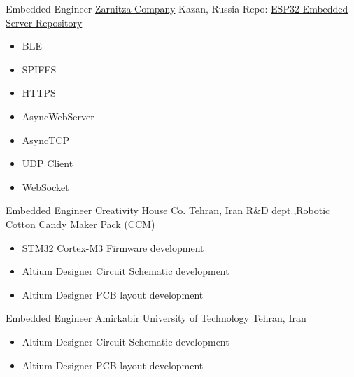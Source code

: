         {Embedded Engineer}
        {\href{https://zarnitza.ru/}{\color{blue}Zarnitza Company}}
        {Kazan, Russia}
        {
        \newline
        Repo: \href{https://github.com/Ehsan2754/embedded-server}{\color{blue}ESP32 Embedded Server Repository}
        } 
        {
        \begin{itemize}
            \item  BLE
            \item SPIFFS
            \item HTTPS 
            \item AsyncWebServer
            \item AsyncTCP 
            \item UDP Client
            \item WebSocket
        \end{itemize}
        }
        
	{Embedded Engineer}
	{\href{https://www.instagram.com/creativityhouse.ir/}{\color{blue}Creativity House Co.}}
        {Tehran, Iran}
	{
         \newline
         R\&D dept.,Robotic Cotton Candy Maker Pack (CCM) }
         {
         \begin{itemize}
            \item STM32 Cortex-M3 Firmware development
            \item Altium Designer Circuit Schematic development
            \item Altium Designer  PCB layout development
         \end{itemize}
         }


    {Embedded Engineer}
    {Amirkabir University of Technology}
    {Tehran, Iran}
    {
    \newline
    \href{https://phee.aut.ac.ir/en}{\color{blue}{Physics and Energy Faculty}}}
    {
    \begin{itemize}
        \item Altium Designer Circuit Schematic development
        \item Altium Designer  PCB layout development
    \end{itemize}
     }
     
